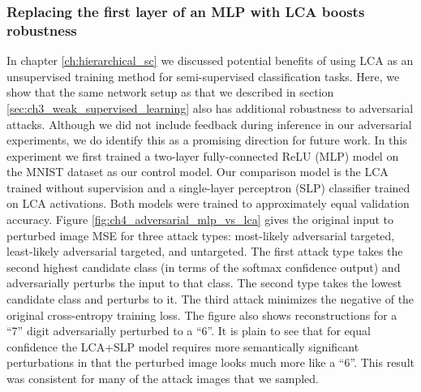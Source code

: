 \subsubsection{Replacing the first layer of an MLP with LCA boosts robustness}
In chapter \ref{ch:hierarchical_sc} we discussed potential benefits of using LCA as an unsupervised training method for semi-supervised classification tasks. Here, we show that the same network setup as that we described in section \ref{sec:ch3_weak_supervised_learning} also has additional robustness to adversarial attacks. Although we did not include feedback during inference in our adversarial experiments, we do identify this as a promising direction for future work. In this experiment we first trained a two-layer fully-connected ReLU (MLP) model on the MNIST dataset as our control model. Our comparison model is the LCA trained without supervision and a single-layer perceptron (SLP) classifier trained on LCA activations. Both models were trained to approximately equal validation accuracy. Figure \ref{fig:ch4_adversarial_mlp_vs_lca} gives the original input to perturbed image MSE for three attack types: most-likely adversarial targeted, least-likely adversarial targeted, and untargeted. The first attack type takes the second highest candidate class (in terms of the softmax confidence output) and adversarially perturbs the input to that class. The second type takes the lowest candidate class and perturbs to it. The third attack minimizes the negative of the original cross-entropy training loss. The figure also shows reconstructions for a ``7'' digit adversarially perturbed to a ``6''. It is plain to see that for equal confidence the LCA+SLP model requires more semantically significant perturbations in that the perturbed image looks much more like a ``6''. This result was consistent for many of the attack images that we sampled.

